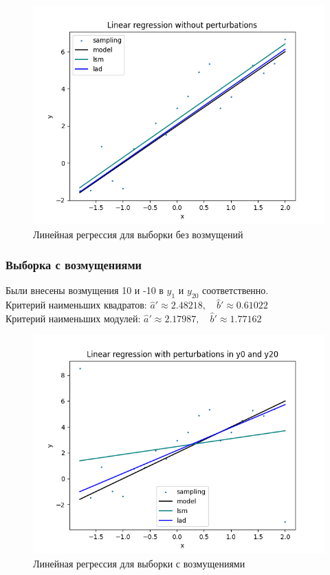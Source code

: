 \begin{figure}[H]
	\begin{center}
		\includegraphics[scale=0.7]{regression_without_pert.png}
	\end{center}
	\caption{Линейная регрессия для выборки без возмущений}
\end{figure}

\subsubsection{Выборка с возмущениями}

Были внесены возмущения 10 и -10 в $y_1$ и $y_{20}$ соответственно. \\

Критерий наименьших квадратов: $\hat{a}' \approx 2.48218, \quad \hat{b}' \approx 0.61022$ \\

Критерий наименьших модулей: $\hat{a}' \approx 2.17987, \quad \hat{b}' \approx 1.77162$

\begin{figure}[H]
	\begin{center}
		\includegraphics[scale=0.7]{regression_with_pert.png}
	\end{center}
	\caption{Линейная регрессия для выборки с возмущениями}
\end{figure}

